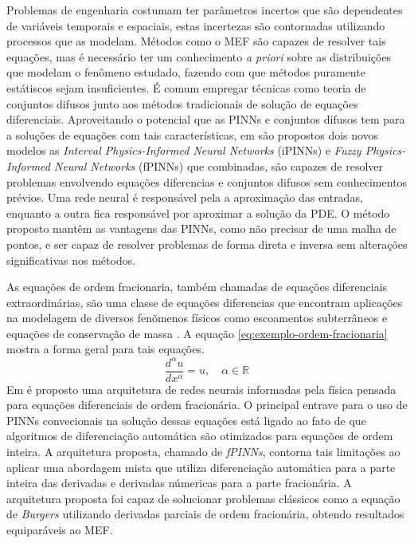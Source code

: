 Problemas de engenharia costumam ter parâmetros incertos que são dependentes 
de variáveis temporais e espaciais, estas incertezas são contornadas utilizando
processos que as modelam.
Métodos como o MEF são capazes de resolver tais equações, mas é necessário ter um
conhecimento \textit{a priori} sobre as distribuições que modelam o fenômeno estudado,
fazendo com que métodos puramente estátiscos sejam insuficientes.
É comum empregar técnicas como teoria de conjuntos difusos junto aos métodos 
tradicionais de solução de equações diferenciais.
Aproveitando o potencial que as PINNs e conjuntos difusos tem para a soluções 
de equações com tais características, em \cite{fugh-etal:2022-fuzzy-pinns} 
são propostos dois novos modelos as 
\textit{Interval Physics-Informed Neural Networks} (iPINNs) e 
\textit{Fuzzy Physics-Informed Neural Networks} (fPINNs) que combinadas, 
são capazes de resolver problemas envolvendo equações diferencias e conjuntos 
difusos sem conhecimentos prévios. Uma rede neural é responsável pela a aproximação 
das entradas, enquanto a outra fica responsável por aproximar a solução da PDE.  
O método proposto mantêm as vantagens das PINNs, como não precisar de uma 
malha de pontos, e ser capaz de resolver problemas de forma direta e inversa
sem alterações significativas nos métodos.

As equações de ordem fracionaria, também chamadas de equações diferenciais 
extraordinárias, são uma classe de equações diferencias que encontram aplicações 
na modelagem de diversos fenõmenos físicos como escoamentos subterrâneos 
\cite{atangana-2013-fluxo-ordem-fracionaria} e equações de conservação de massa
\cite{wheatcraft-2008-conservacao-de-massa-fracionaria}. 
A equação \ref{eq:exemplo-ordem-fracionaria} mostra a forma geral para tais equações.
\begin{equation}\label{eq:exemplo-ordem-fracionaria}
    \dfrac{d^{\alpha}u}{dx^{\alpha}} = u, \quad \alpha \in \mathbb{R}
\end{equation}
Em \cite{pang-etal:2019-fPINNs} é proposto uma arquitetura de redes neurais 
informadas pela física pensada para equações diferenciais de ordem fracionária.
O principal entrave para o uso de PINNs convecionais na solução dessas equações
está ligado ao fato de que algoritmos de diferenciação automática são otimizados
para equações de ordem inteira.
A arquitetura proposta, chamado de \textit{fPINNs}, contorna tais limitações ao
aplicar uma abordagem mista que utiliza diferenciação automática para a parte inteira
das derivadas e derivadas númericas para a parte fracionária.
A arquitetura proposta foi capaz de solucionar problemas clássicos como a equação de 
\textit{Burgers} utilizando derivadas parciais de ordem fracionária, obtendo
resultados equiparáveis ao MEF.

